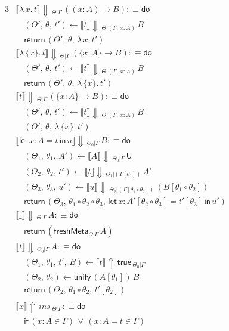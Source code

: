 \documentclass[acmsmall,review,anonymous,prologue,dvipsnames]{acmart}\settopmatter{printfolios=true,printccs=false,printacmref=false}
\newcommand{\slet}{\boldsymbol{\mathsf{let}}}
\renewcommand{\sin}{\boldsymbol{\mathsf{in}}}
\renewcommand{\U}{\mathsf{U}}
\newcommand{\freshMeta}[3]{\mathsf{freshMeta}_{#1|#2}\,#3}
\newcommand{\unify}{\mathsf{unify}}
\newcommand{\echeck}[4]{\llbracket#1\rrbracket\!\Downarrow\,_{#2|#3}\,#4}
\newcommand{\einfer}[4]{\llbracket#1\rrbracket\!\Uparrow\,#2\,_{#3|#4}}
\newcommand{\edo}{\boldsymbol{\mathsf{do}}}
\newcommand{\ereturn}{\boldsymbol{\mathsf{return}}}
\newcommand{\eif}{\boldsymbol{\mathsf{if}}}
\newcommand{\true}{\mathsf{true}}
\theoremstyle{remark}
\begin{document}
\begingroup
\allowdisplaybreaks
\begin{alignat*}{3}
  &\echeck{\lambda\,x.\,t}{\Theta}{\Gamma}{((x : A)\to B)} :\equiv \edo \\
  &\quad(\Theta',\,\theta,\,t') \leftarrow \echeck{t}{\Theta}{(\Gamma,\,x:A)} B\\
  &\quad\ereturn\,(\Theta',\,\theta,\,\lambda\,x.\,t')\\
  &\echeck{\lambda\,\{x\}.\,t}{\Theta}{\Gamma}{(\{x : A\}\to B)} :\equiv \edo \\
  &\quad(\Theta',\,\theta,\,t') \leftarrow \echeck{t}{\Theta}{(\Gamma,\,x:A)} B\\
  &\quad\ereturn\,(\Theta',\,\theta,\,\lambda\,\{x\}.\,t')\\
  &\echeck{t}{\Theta}{\Gamma}{(\{x : A\}\to B)} : \equiv \edo \\
  &\quad (\Theta',\,\theta,\,t') \leftarrow \echeck{t}{\Theta}{(\Gamma,\,x:A)} B\\
  &\quad (\Theta',\,\theta,\,\lambda\,\{x\}.\,t')\\
  &\echeck{\slet\,x:A=t\,\sin\,u}{\Theta_0}{\Gamma}{B} :\equiv \edo \\
  &\quad(\Theta_1,\,\theta_1,\,A') \leftarrow \echeck{A}{\Theta_0}{\Gamma}{\U}\\
  &\quad(\Theta_2,\,\theta_2,\,t') \leftarrow \echeck{t}
                {\Theta_1}{(\Gamma[\theta_1])}{A'}\\
  &\quad(\Theta_3,\,\theta_3,\,u') \leftarrow
                \echeck{u}{\Theta_2}{(\Gamma[\theta_1\circ\theta_2])}{(B[\theta_1\circ\theta_2])}\\
  &\quad\ereturn\,(\Theta_3,\,\theta_1\circ\theta_2\circ\theta_3,\,\slet\,x:A'[\theta_2\circ\theta_3]=t'[\theta_3]\,\sin\,u')\\
  &\echeck{\_}{\Theta}{\Gamma}{A} :\equiv \edo \\
  &\quad\ereturn\,(\freshMeta{\Theta}{\Gamma}{A})\\
  &\echeck{t}{\Theta_0}{\Gamma}{A} :\equiv \edo \\
  &\quad(\Theta_1,\,\theta_1,\,t',\,B) \leftarrow \einfer{t}{\true}{\Theta_0}{\Gamma}\\
  &\quad(\Theta_2,\,\theta_2) \leftarrow \unify\,(A[\theta_1])\,B\\
  &\quad\ereturn\,(\Theta_2,\,\theta_1\circ\theta_2,\,t'[\theta_2])\\\\
  &\einfer{x}{ins}{\Theta}{\Gamma} :\equiv \edo\\
  &\quad\eif\,(x : A \in \Gamma)\,\lor\,(x : A = t \in \Gamma) \\

\end{alignat*}
\end{document}
